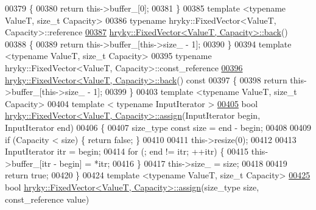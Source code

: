 \begin{DoxyCode}
00379 \textcolor{keyword}{}\{
00380     \textcolor{keywordflow}{return} this->buffer\_[0];
00381 \}
00385 \textcolor{keyword}{template} <\textcolor{keyword}{typename} ValueT, \textcolor{keywordtype}{size\_t} Capacity>
00386 \textcolor{keyword}{typename} hryky::FixedVector<ValueT, Capacity>::reference
\hypertarget{fixed__vector_8h_source_l00387}{}\hyperlink{classhryky_1_1_fixed_vector_ae5f931bb72bde3650c40100dafc43cea}{00387} \hyperlink{classhryky_1_1_fixed_vector}{hryky::FixedVector<ValueT, Capacity>::back}()
00388 \{
00389     \textcolor{keywordflow}{return} this->buffer\_[this->size\_ - 1];
00390 \}
00394 \textcolor{keyword}{template} <\textcolor{keyword}{typename} ValueT, \textcolor{keywordtype}{size\_t} Capacity>
00395 \textcolor{keyword}{typename} hryky::FixedVector<ValueT, Capacity>::const\_reference
\hypertarget{fixed__vector_8h_source_l00396}{}\hyperlink{classhryky_1_1_fixed_vector_a5b5c7152cd9d65261780fb290849a78c}{00396} \hyperlink{classhryky_1_1_fixed_vector}{hryky::FixedVector<ValueT, Capacity>::back}()\textcolor{keyword}{ const}
00397 \textcolor{keyword}{}\{
00398     \textcolor{keywordflow}{return} this->buffer\_[this->size\_ - 1];
00399 \}
00403 \textcolor{keyword}{template} <\textcolor{keyword}{typename} ValueT, \textcolor{keywordtype}{size\_t} Capacity>
00404 \textcolor{keyword}{template} < \textcolor{keyword}{typename} InputIterator >
\hypertarget{fixed__vector_8h_source_l00405}{}\hyperlink{classhryky_1_1_fixed_vector_abc3570645b1282b0e6a5264f610fd9bc}{00405} \textcolor{keywordtype}{bool} \hyperlink{classhryky_1_1_fixed_vector}{hryky::FixedVector<ValueT, Capacity>::assign}(InputIterator begin, 
      InputIterator end)
00406 \{
00407     size\_type \textcolor{keyword}{const} size = end - begin;
00408 
00409     \textcolor{keywordflow}{if} (Capacity < size) \{ \textcolor{keywordflow}{return} \textcolor{keyword}{false}; \}
00410 
00411     this->resize(0);
00412 
00413     InputIterator itr = begin;
00414     \textcolor{keywordflow}{for} (; end != itr; ++itr) \{
00415         this->buffer\_[itr - begin] = *itr;
00416     \}
00417     this->size\_ = size;
00418 
00419     \textcolor{keywordflow}{return} \textcolor{keyword}{true};
00420 \}
00424 \textcolor{keyword}{template} <\textcolor{keyword}{typename} ValueT, \textcolor{keywordtype}{size\_t} Capacity>
\hypertarget{fixed__vector_8h_source_l00425}{}\hyperlink{classhryky_1_1_fixed_vector_a1bf7588b15fe89dc8f04d843c4722e02}{00425} \textcolor{keywordtype}{bool} \hyperlink{classhryky_1_1_fixed_vector}{hryky::FixedVector<ValueT, Capacity>::assign}(size\_type size, 
      const\_reference value)

\end{DoxyCode}
